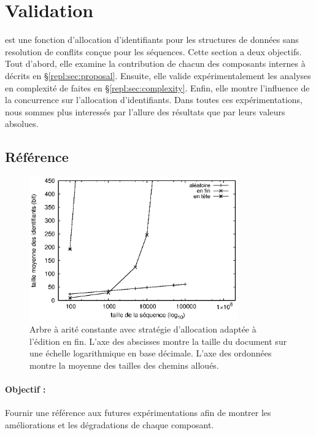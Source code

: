 
\section{Validation}
\label{repl:sec:validation}

\LSEQ est une fonction d'allocation d'identifiants pour les structures de
données sans resolution de conflits conçue pour les séquences.  Cette section a
deux objectifs. Tout d'abord, elle examine la contribution de chacun des
composants internes à \LSEQ décrits en §\ref{repl:sec:proposal}.  Ensuite, elle
valide expérimentalement les analyses en complexité de \LSEQ faites en
§\ref{repl:sec:complexity}. Enfin, elle montre l'influence de la concurrence sur
l'allocation d'identifiants. Dans toutes ces expérimentations, nous sommes plus
interessés par l'allure des résultats que par leurs valeurs absolues.

\subsection{Référence}

\begin{figure}
  \begin{center}
    \includegraphics[width=0.8\textwidth]{img/lseq/logoot.eps}
    \caption[Référence de la taille des chemins]
    {\label{repl:img:logoot} Arbre à arité constante avec stratégie d'allocation
      adaptée à l'édition en fin. L'axe des abscisses montre la taille du
      document sur une échelle logarithmique en base décimale. L'axe des
      ordonnées montre la moyenne des tailles des chemins alloués.}
  \end{center}
\end{figure}


\paragraph{Objectif :} Fournir une référence aux futures expérimentations afin
de montrer les améliorations et les dégradations de chaque composant.


